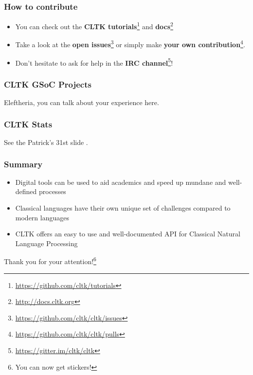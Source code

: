 \documentclass{beamer}
\begin{document}
\begin{frame}
\frametitle{How to contribute}
\begin{itemize}
    \item You can check out the \textbf{CLTK tutorials}\footnote{\href{https://github.com/cltk/tutorials}{https://github.com/cltk/tutorials}} and \textbf{docs}\footnote{\href{http://docs.cltk.org}{http://docs.cltk.org}}
    \item Take a look at the \textbf{open issues}\footnote{\href{https://github.com/cltk/cltk/issues}{https://github.com/cltk/cltk/issues}} or simply make \textbf{your own contribution}\footnote{\href{https://github.com/cltk/cltk/pulls}{https://github.com/cltk/cltk/pulls}}.
    \item Don’t hesitate to ask for help in the \textbf{IRC channel}\footnote{\href{https://gitter.im/cltk/cltk}{https://gitter.im/cltk/cltk}}!
\end{itemize}
\end{frame}

\begin{frame}
\frametitle{CLTK GSoC Projects}

Eleftheria, you can talk about your experience here.
\end{frame}


\begin{frame}
\frametitle{CLTK Stats}

See the Patrick's 31st slide .
\end{frame}



\begin{frame}
\frametitle{Summary}
\begin{itemize}
    \item Digital tools can be used to aid academics and speed up mundane and well-defined processes
    \item Classical languages have their own unique set of challenges compared to modern languages
    \item CLTK offers an easy to use and well-documented API for Classical Natural Language Processing
\end{itemize}
\end{frame}


\begin{frame}
\begin{center}
    Thank you for your attention!\footnote{{You can now get stickers! \footnotesize}}
\end{center}




\end{frame}
\end{document}
